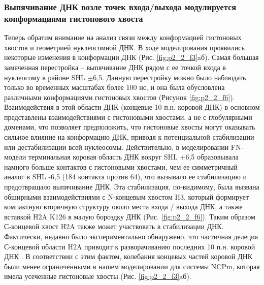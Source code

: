 \subsubsection{Выпячивание ДНК возле точек входа/выхода модулируется конформациями гистонового хвоста}
    Теперь обратим внимание на анализ связи между конформацией гистоновых хвостов и геометрией нуклеосомной ДНК. В ходе моделирования проявились некоторые изменения в конформации ДНК (Рис. \ref{fig:p2_2_f3}aб). Самая большая замеченная перестройка -- выпячивание ДНК рядом с ее точкой входа в нуклеосому в районе SHL $\pm$6,5. Данную перестройку можно было наблюдать только во временных масштабах более 100 нс, и она была обусловлена различными конформациями гистоновых хвостов (Рисунок \ref{fig:p2_2_f6}). Взаимодействия в этой области ДНК (концевые 10 п.н. коровой ДНК) в основном представлены взаимодействиями с гистоновыми хвостами, а не с глобулярными доменами, что позволяет предположить, что гистоновые хвосты могут оказывать сильное влияние на конформацию ДНК, приводя к потенциальной стабилизации или дестабилизации всей нуклеосомы. Действительно, в моделировании FN-модели терминальная коровая область ДНК вокруг SHL +6,5 образовывала намного больше контактов с гистоновыми хвостами, чем ее симметричный аналог в SHL -6,5 (184 контакта против 64), что вызывало ее стабилизацию и предотвращало выпячивание ДНК. Эта стабилизация, по-видимому, была вызвана обширными взаимодействиями с N-концевым хвостом H3, который формирует компактную вторичную структуру около места входа / выхода ДНК, а также вставкой H2A K126 в малую бороздку ДНК (Рис. \ref{fig:p2_2_f6}). Таким образом С-концевой хвост H2A также может участвовать в стабилизации ДНК. Фактически, недавно было экспериментально обнаружено, что частичная делеция С-концевой области H2A приводит к разворачиванию последних 10 п.н. коровой ДНК \cite{shukla_docking_2011}. В соответствии с этим фактом, колебания концевых частей коровой ДНК были менее ограниченными в нашем моделировании для системы NCPm, которая имела усеченные гистоновые хвосты (Рис. \ref{fig:p2_2_f3}aб).



